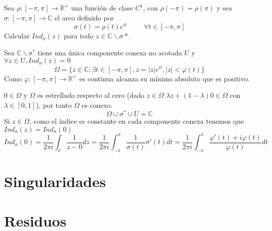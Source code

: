 \begin{ejer}
	Sea $\rho : [-\pi,\pi]\rightarrow\mathbb{R}^+$ una función de clase $C^1$, con $\rho(-\pi) = \rho(\pi)$ y sea $\sigma :[-\pi,\pi] \rightarrow\mathbb{C}$ el arco definido por
	$$ \sigma(t) = \rho(t)e^{it} \hspace{1cm} \forall t\in [-\pi,\pi] $$
	Calcular $Ind_{\sigma}(z)$ para todo $z\in\mathbb{C}\backslash\sigma{\ast}$.
\end{ejer}
\begin{sol}
	
	Sea $\mathbb{C}\backslash\sigma^{\ast}$ tiene una única componente conexa no acotada $U$ y $\forall z\in U, Ind_{\sigma}(z)=0$
	$$\Omega = \{ z\in\mathbb{C} : \exists t\in[-\pi,\pi], z=|z|e^{it}, |z|<\varphi(t) \}$$
	Como $\varphi : [-\pi,\pi] \rightarrow \mathbb{R}^+$ es continua alcanza su mínimo absoluto que es positivo.
	
	$0\in\Omega$ y $\Omega$ es estrellado respecto al cero
	(dado $z\in\Omega$ $\lambda z + (1-\lambda)0 \in\Omega$ con $\lambda\in[0,1]$), por tanto $\Omega$ es conexo.
	$$\Omega \cup \sigma^{\ast} \cup U = \mathbb{C}$$
	Si $z\in\Omega$, como el índice es constante en cada componente conexa tenemos que $Ind_{\sigma}(z) = Ind_{\sigma}(0)$
	$$Ind_{\sigma}(0) = \frac{1}{2\pi i} \int_{\sigma} \frac{1}{z-0}dz = \frac{1}{2\pi i} \int_{-\pi}^{\pi} \frac{1}{\sigma(t)} \sigma'(t)dt = \frac{1}{2\pi i} \int_{-\pi}^{\pi} \frac{\varphi'(t)+i\varphi(t)}{\varphi(t)} dt$$
	
\end{sol}




\newpage


\section{Singularidades}



\newpage


\section{Residuos}

